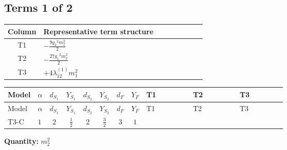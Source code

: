 \documentclass[8pt]{article}
\begin{document}
\begin{landscape}
\subsection*{Terms 1 of 2}
\begin{center}
\begin{tabular}{@{}c >{\raggedright\arraybackslash}p{0.82\linewidth}@{}}
\toprule
Column & Representative term structure \\
\midrule
T1 & \(\displaystyle -\frac{9 {g_2}^2 {m_2^2}}{2}\) \\
\midrule
T2 & \(\displaystyle -\frac{27 {g_1}^2 {m_2^2}}{2}\) \\
\midrule
T3 & \(\displaystyle +4 {\lambda_{12}^{(1)}} {m_1^2}\) \\
\midrule
\bottomrule
\end{tabular}
\end{center}
\smallskip
\tiny
\begin{longtable}{@{}llcccccc >{\raggedright\arraybackslash}p{0.21\linewidth} >{\raggedright\arraybackslash}p{0.21\linewidth} >{\raggedright\arraybackslash}p{0.21\linewidth}@{}}
\toprule
Model & $\alpha$ & $d_{S_1}$ & $Y_{S_1}$ & $d_{S_2}$ & $Y_{S_2}$ & $d_F$ & $Y_F$ & T1 & T2 & T3 \\
\midrule
\endfirsthead
\toprule
Model & $\alpha$ & $d_{S_1}$ & $Y_{S_1}$ & $d_{S_2}$ & $Y_{S_2}$ & $d_F$ & $Y_F$ & T1 & T2 & T3 \\
\midrule
\endhead
T3-C & $1$ & $2$ & $\frac{1}{2}$ & $2$ & $\frac{3}{2}$ & $3$ & $1$ & \scriptsize\adjustbox{max width=\linewidth}{$\begin{gathered} -\frac{9 {g_2}^2 {m_2^2}}{2}\end{gathered}$} & \scriptsize\adjustbox{max width=\linewidth}{$\begin{gathered} -\frac{27 {g_1}^2 {m_2^2}}{2}\end{gathered}$} & \scriptsize\adjustbox{max width=\linewidth}{$\begin{gathered} +4 {\lambda_{12}^{(1)}} {m_1^2}\end{gathered}$} \\
\midrule
\bottomrule
\end{longtable}
\clearpage
\noindent\textbf{Quantity: }$m_2^2$\par\smallskip

\end{landscape}
\end{document}
